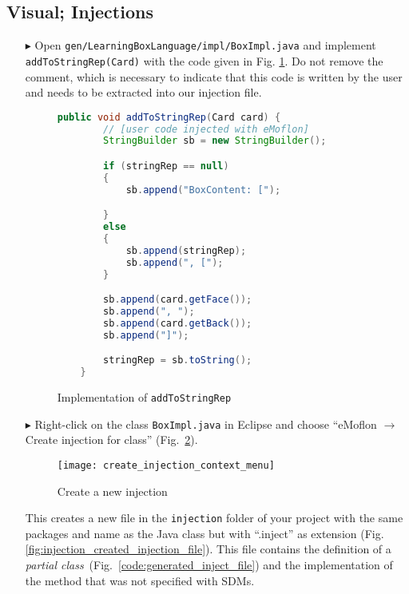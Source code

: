 \newpage
\subsection{Visual; Injections}
\visHeader
\hypertarget{injections vis}{}

\begin{enumerate}
    \item[$\blacktriangleright$] Open \texttt{gen/LearningBoxLanguage/impl/BoxImpl.java} and implement \texttt{addToStringRep(Card)} with the code given in Fig.
    \ref{fig:addToStringRep_impl}. Do not remove the comment, which is necessary to indicate that this code is written by the user and needs to be extracted
    into our injection file.

    \begin{figure}[htbp]
        \centering
        \begin{lstlisting}[language=Java, keywordstyle={\bfseries\color{purple}}, backgroundcolor=\color{white}]
    public void addToStringRep(Card card) {
        // [user code injected with eMoflon]
        StringBuilder sb = new StringBuilder();

        if (stringRep == null)
        {
            sb.append("BoxContent: [");

        }
        else
        {
            sb.append(stringRep);
            sb.append(", [");
        }

        sb.append(card.getFace());
        sb.append(", ");
        sb.append(card.getBack());
        sb.append("]");

        stringRep = sb.toString();
    }
        \end{lstlisting}
        \caption{Implementation of \texttt{addToStringRep}}
        \label{fig:addToStringRep_impl}
    \end{figure}

    \item[$\blacktriangleright$] Right-click on the class \texttt{BoxImpl.java} in Eclipse and choose ``eMoflon $\rightarrow$ Create injection for class''
    (Fig.~\ref{fig:injection_create_injection}).

    \begin{figure}[htbp]
        \centering
        \texttt{[image: create\_injection\_context\_menu]}
        \caption{Create a new injection}
        \label{fig:injection_create_injection}
    \end{figure}

    This creates a new file in the \texttt{injection} folder of your project with the same packages and name as the Java class but with ``.inject'' as extension
    (Fig. \ref{fig:injection_created_injection_file}). This file contains the definition of a \textit{partial class}~(Fig.~\ref{code:generated_inject_file}) and
    the implementation of the method that was not specified with SDMs.


\end{enumerate}
